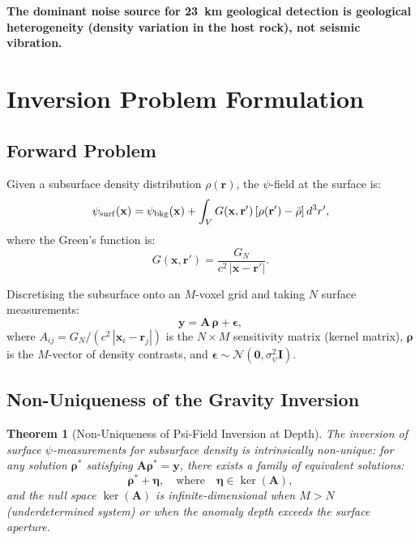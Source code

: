 \documentclass[aps,prd,twocolumn,superscriptaddress,nofootinbib]{revtex4-2}
\newtheorem{theorem}{Theorem}
\begin{document}
\textbf{The dominant noise source for 23~km geological detection is
geological heterogeneity (density variation in the host rock),
not seismic vibration.}

\section{Inversion Problem Formulation}
\label{sec:inversion}

\subsection{Forward Problem}

Given a subsurface density distribution $\rho(\mathbf{r})$, the
$\psi$-field at the surface is:
\begin{equation}
  \psi_{\rm surf}(\mathbf{x}) = \psi_{\rm bkg}(\mathbf{x})
  + \int_V G(\mathbf{x},\mathbf{r}')\,[\rho(\mathbf{r}') - \bar\rho]
  \,d^3r',
  \label{eq:forward}
\end{equation}
where the Green's function is:
\begin{equation}
  G(\mathbf{x},\mathbf{r}') = \frac{G_N}{c^2\,|\mathbf{x} - \mathbf{r}'|}.
  \label{eq:greens}
\end{equation}

Discretising the subsurface onto an $M$-voxel grid and taking $N$
surface measurements:
\begin{equation}
  \mathbf{y} = \mathbf{A}\,\boldsymbol{\rho} + \boldsymbol{\epsilon},
  \label{eq:discrete-forward}
\end{equation}
where $A_{ij} = G_N/(c^2\,|\mathbf{x}_i - \mathbf{r}_j|)$ is the
$N \times M$ sensitivity matrix (kernel matrix), $\boldsymbol{\rho}$
is the $M$-vector of density contrasts, and
$\boldsymbol{\epsilon} \sim \mathcal{N}(\mathbf{0},\sigma_\psi^2\mathbf{I})$.

\subsection{Non-Uniqueness of the Gravity Inversion}

\begin{theorem}[Non-Uniqueness of Psi-Field Inversion at Depth]
\label{thm:nonunique}
The inversion of surface $\psi$-measurements for subsurface density is
\emph{intrinsically non-unique}: for any solution $\boldsymbol{\rho}^*$
satisfying $\mathbf{A}\boldsymbol{\rho}^* = \mathbf{y}$, there exists
a family of equivalent solutions:
\begin{equation}
  \boldsymbol{\rho}^* + \boldsymbol{\eta}, \quad \text{where}
  \quad \boldsymbol{\eta} \in \ker(\mathbf{A}),
  \label{eq:null-space}
\end{equation}
and the null space $\ker(\mathbf{A})$ is infinite-dimensional when
$M > N$ (underdetermined system) or when the anomaly depth exceeds
the surface aperture.
\end{theorem}
\end{document}

